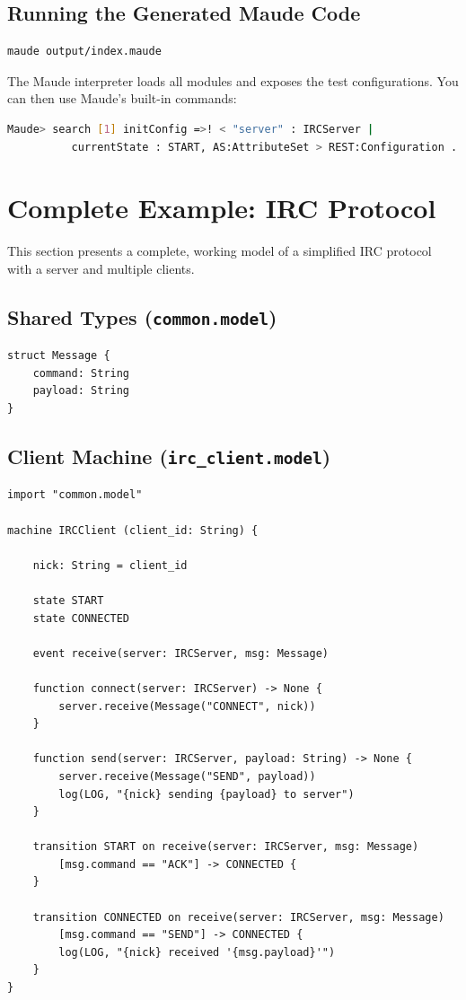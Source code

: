 \documentclass[11pt,letterpaper]{article}
\begin{document}
\subsection{Running the Generated Maude Code}

\begin{lstlisting}[language=bash,numbers=none]
maude output/index.maude
\end{lstlisting}

The Maude interpreter loads all modules and exposes the test
configurations.  You can then use Maude's built-in commands:

\begin{lstlisting}[language=bash,numbers=none]
Maude> search [1] initConfig =>! < "server" : IRCServer |
          currentState : START, AS:AttributeSet > REST:Configuration .
\end{lstlisting}


\section{Complete Example: IRC Protocol}
\label{sec:example}

This section presents a complete, working model of a simplified IRC
protocol with a server and multiple clients.

\subsection{Shared Types (\texttt{common.model})}

\begin{lstlisting}
struct Message {
    command: String
    payload: String
}
\end{lstlisting}

\subsection{Client Machine (\texttt{irc\_client.model})}

\begin{lstlisting}
import "common.model"

machine IRCClient (client_id: String) {

    nick: String = client_id

    state START
    state CONNECTED

    event receive(server: IRCServer, msg: Message)

    function connect(server: IRCServer) -> None {
        server.receive(Message("CONNECT", nick))
    }

    function send(server: IRCServer, payload: String) -> None {
        server.receive(Message("SEND", payload))
        log(LOG, "{nick} sending {payload} to server")
    }

    transition START on receive(server: IRCServer, msg: Message)
        [msg.command == "ACK"] -> CONNECTED {
    }

    transition CONNECTED on receive(server: IRCServer, msg: Message)
        [msg.command == "SEND"] -> CONNECTED {
        log(LOG, "{nick} received '{msg.payload}'")
    }
}
\end{lstlisting}
\end{document}
